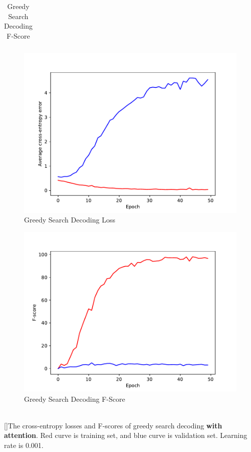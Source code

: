 \documentclass[11pt,a4paper]{article}
\begin{document}
\begin{table}[ht]
\centering
\begin{tabular}{cc}
\end{tabular}
\begin{subfigure}{0.4\textwidth}\centering\includegraphics[width=0.7\columnwidth]{fig_lrn_0p001_atten_loss.pdf}\caption{Greedy Search Decoding Loss}\end{subfigure} %
\begin{subfigure}{0.4\textwidth}\centering\includegraphics[width=0.7\columnwidth]{fig_lrn_0p001_atten_f.pdf}\caption{Greedy Search Decoding F-Score}\end{subfigure} \\

[]{The cross-entropy losses and F-scores of greedy search decoding \textbf{with attention}. Red curve is training set, and blue curve is validation set. Learning rate is 0.001. }
\label{fig:attn_losses_fscore}
\end{table}
\end{document}
